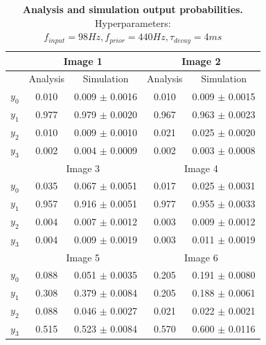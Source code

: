 \begin{table}[]
\centering
\label{tab:1D_98_440_4}
\small
\tabcolsep=0.11cm
\begin{tabular}{|c|cc|cc|}
\hline
                       & \multicolumn{2}{c|}{Image 1}                       & \multicolumn{2}{c|}{Image 2}                       \\ \hline
                       & \multicolumn{1}{c|}{Analysis} & Simulation         & \multicolumn{1}{c|}{Analysis} & Simulation         \\ \hline
$y_0$                  & \multicolumn{1}{c|}{0.010}    & 0.009 $\pm$ 0.0016 & \multicolumn{1}{c|}{0.010}    & 0.009 $\pm$ 0.0015 \\ \hline
$y_1$                  & \multicolumn{1}{c|}{0.977}    & 0.979 $\pm$ 0.0020 & \multicolumn{1}{c|}{0.967}    & 0.963 $\pm$ 0.0023 \\ \hline
$y_2$                  & \multicolumn{1}{c|}{0.010}    & 0.009 $\pm$ 0.0010 & \multicolumn{1}{c|}{0.021}    & 0.025 $\pm$ 0.0020 \\ \hline
$y_3$                  & \multicolumn{1}{c|}{0.002}    & 0.004 $\pm$ 0.0009 & \multicolumn{1}{c|}{0.002}    & 0.003 $\pm$ 0.0008 \\ \hline
                       & \multicolumn{2}{c|}{Image 3}                       & \multicolumn{2}{c|}{Image 4}                       \\ \hline
$y_0$                  & \multicolumn{1}{c|}{0.035}    & 0.067 $\pm$ 0.0051 & \multicolumn{1}{c|}{0.017}    & 0.025 $\pm$ 0.0031 \\ \hline
$y_1$                  & \multicolumn{1}{c|}{0.957}    & 0.916 $\pm$ 0.0051 & \multicolumn{1}{c|}{0.977}    & 0.955 $\pm$ 0.0033 \\ \hline
$y_2$                  & \multicolumn{1}{c|}{0.004}    & 0.007 $\pm$ 0.0012 & \multicolumn{1}{c|}{0.003}    & 0.009 $\pm$ 0.0012 \\ \hline
$y_3$                  & \multicolumn{1}{c|}{0.004}    & 0.009 $\pm$ 0.0019 & \multicolumn{1}{c|}{0.003}    & 0.011 $\pm$ 0.0019 \\ \hline
						& \multicolumn{2}{c|}{Image 5}                       & \multicolumn{2}{c|}{Image 6}                       \\ \hline
$y_0$                  & \multicolumn{1}{c|}{0.088}    & 0.051 $\pm$ 0.0035 & \multicolumn{1}{c|}{0.205}    & 0.191 $\pm$ 0.0080 \\ \hline
$y_1$                  & \multicolumn{1}{c|}{0.308}    & 0.379 $\pm$ 0.0084 & \multicolumn{1}{c|}{0.205}    & 0.188 $\pm$ 0.0061 \\ \hline
$y_2$                  & \multicolumn{1}{c|}{0.088}    & 0.046 $\pm$ 0.0027 & \multicolumn{1}{c|}{0.021}    & 0.022 $\pm$ 0.0021 \\ \hline
$y_3$                  & \multicolumn{1}{c|}{0.515}    & 0.523 $\pm$ 0.0084 & \multicolumn{1}{c|}{0.570}    & 0.600 $\pm$ 0.0116 \\ \hline
\end{tabular}
\caption{\textbf{Analysis and simulation output probabilities. } Hyperparameters: $f_{input} = 98 Hz, f_{prior} = 440 Hz, \tau_{decay} = 4 ms$}
\end{table}

